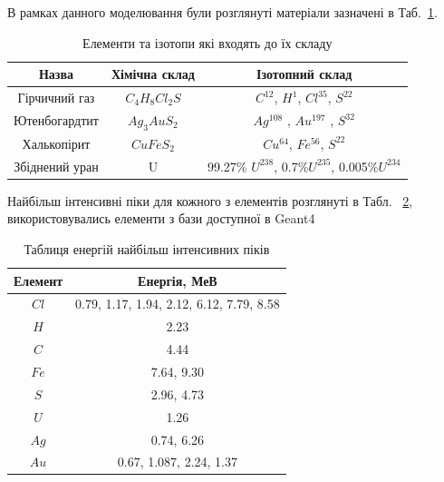 \documentclass[a4paper, 14pt]{article}
\numberwithin{equation}{section}
\numberwithin{table}{section}
\begin{document}
В рамках данного моделювання були розглянуті матеріали зазначені в Таб.~\ref{tabl:Materials}.
\begin{table}[h]
	\centering
	\caption{Елементи та ізотопи які входять до їх складу} 
	\begin{tabular}{|c|c|c|}
		\hline
		Назва & Хімічна склад & Ізотопний склад \\
		\hline
		Гірчичний газ & $C_4H_8Cl_2S$ & $C^{12}$, 	$H^1$, $Cl^{35}$, $S^{22}$ \\
		\hline
		Ютенбогардтит & $Ag_3AuS_2$ & $Ag^{108}$ , $Au^{197}$ , $S^{32}$ \\
		\hline
		Халькопірит & $CuFeS_2$ & $Cu^{64}$, $Fe^{56}$, $S^{22}$ \\
		\hline
		Збіднений уран & U & 99.27\% $U^{238}$, 0.7\%$U^{235}$, 0.005\%$U^{234}$\\
		\hline
	\end{tabular}
	\label{tabl:Materials}
\end{table}

Найбільш інтенсивні піки для кожного з елементів розглянуті в Табл. ~\ref{tabl:ElementsEnergy}, використовувались елементи з бази доступної в Geant4
\begin{table}[h]
	\centering
	\caption{Таблиця енергій найбільш інтенсивних піків} 
	\begin{tabular}{|c|c|} 
		\hline
		Елемент& Енергія, МеВ \\
		\hline
		$Cl$ & 0.79, 1.17, 1.94, 2.12, 6.12, 7.79, 8.58 \\
		\hline
		$H$ & 2.23 \\
		\hline
		$C$ & 4.44 \\
		\hline
		$Fe$ & 7.64, 9.30 \\		
		\hline
		$S$ & 2.96, 4.73 \\
		\hline
		$U$ & 1.26\\
		\hline
		$Ag$ &  0.74, 6.26 \\
		\hline
		$Au$ & 0.67, 1.087, 2.24, 1.37  \\
		
		\hline
	\end{tabular}
	\label{tabl:ElementsEnergy}
\end{table}
	
\end{document}
